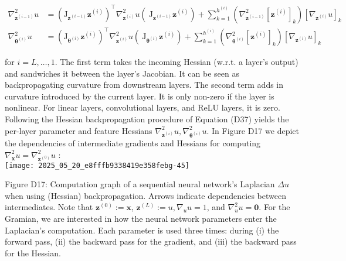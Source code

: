 \documentclass[10pt]{article}
\begin{document}
\begin{align*}
\nabla_{\boldsymbol{z}^{(i-1)}}^{2} u & =\left(\mathrm{J}_{\boldsymbol{z}^{(i-1)}} \boldsymbol{z}^{(i)}\right)^{\top} \nabla_{\boldsymbol{z}^{(i)}}^{2} u\left(\mathrm{~J}_{\boldsymbol{z}^{(i-1)}} \boldsymbol{z}^{(i)}\right)+\sum_{k=1}^{h^{(i)}}\left(\nabla_{\boldsymbol{z}^{(i-1)}}^{2}\left[\boldsymbol{z}^{(i)}\right]_{k}\right)\left[\nabla_{\boldsymbol{z}^{(i)}} u\right]_{k}  \tag{D37}\\
\nabla_{\boldsymbol{\theta}^{(i)}}^{2} u & =\left(\mathrm{J}_{\boldsymbol{\theta}^{(i)}} \boldsymbol{z}^{(i)}\right)^{\top} \nabla_{\boldsymbol{z}^{(i)}}^{2} u\left(\mathrm{~J}_{\boldsymbol{\theta}^{(i)}} \boldsymbol{z}^{(i)}\right)+\sum_{k=1}^{h^{(i)}}\left(\nabla_{\boldsymbol{\theta}^{(i)}}^{2}\left[\boldsymbol{z}^{(i)}\right]_{k}\right)\left[\nabla_{\boldsymbol{z}^{(i)}} u\right]_{k}
\end{align*}


for $i=L, \ldots, 1$. The first term takes the incoming Hessian (w.r.t. a layer's output) and sandwiches it between the layer's Jacobian. It can be seen as backpropagating curvature from downstream layers. The second term adds in curvature introduced by the current layer. It is only non-zero if the layer is nonlinear. For linear layers, convolutional layers, and ReLU layers, it is zero.\\
Following the Hessian backpropagation procedure of Equation (D37) yields the per-layer parameter and feature Hessians $\nabla_{\boldsymbol{z}^{(i)}}^{2} u, \nabla_{\boldsymbol{\theta}^{(i)}}^{2} u$. In Figure D17 we depict the dependencies of intermediate gradients and Hessians for computing $\nabla_{\boldsymbol{x}}^{2} u=\nabla_{\boldsymbol{z}^{(0)}}^{2} u$ :\\
\texttt{[image: 2025\_05\_20\_e8fffb9338419e358febg-45]}

Figure D17: Computation graph of a sequential neural network's Laplacian $\Delta u$ when using (Hessian) backpropagation. Arrows indicate dependencies between intermediates. Note that $\boldsymbol{z}^{(0)}:=\boldsymbol{x}$, $\boldsymbol{z}^{(L)}:=u, \nabla_{u} u=1$, and $\nabla_{u}^{2} u=\mathbf{0}$. For the Gramian, we are interested in how the neural network parameters enter the Laplacian's computation. Each parameter is used three times: during (i) the forward pass, (ii) the backward pass for the gradient, and (iii) the backward pass for the Hessian.
\end{document}
